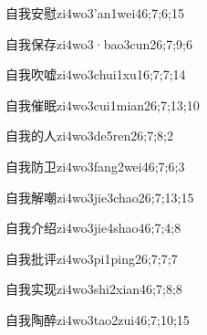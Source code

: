 \begin{verbete}{自我安慰}{zi4wo3'an1wei4}{6;7;6;15}
\end{verbete}

\begin{verbete}{自我保存}{zi4wo3·bao3cun2}{6;7;9;6}
\end{verbete}

\begin{verbete}{自我吹嘘}{zi4wo3chui1xu1}{6;7;7;14}
\end{verbete}

\begin{verbete}{自我催眠}{zi4wo3cui1mian2}{6;7;13;10}
\end{verbete}

\begin{verbete}{自我的人}{zi4wo3de5ren2}{6;7;8;2}
\end{verbete}

\begin{verbete}{自我防卫}{zi4wo3fang2wei4}{6;7;6;3}
\end{verbete}

\begin{verbete}{自我解嘲}{zi4wo3jie3chao2}{6;7;13;15}
\end{verbete}

\begin{verbete}{自我介绍}{zi4wo3jie4shao4}{6;7;4;8}
\end{verbete}

\begin{verbete}{自我批评}{zi4wo3pi1ping2}{6;7;7;7}
\end{verbete}

\begin{verbete}{自我实现}{zi4wo3shi2xian4}{6;7;8;8}
\end{verbete}

\begin{verbete}{自我陶醉}{zi4wo3tao2zui4}{6;7;10;15}
\end{verbete}

